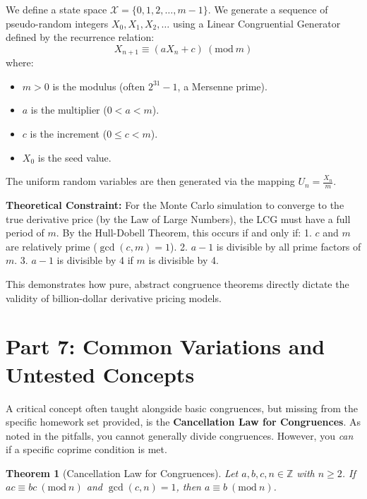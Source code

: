 \documentclass[11pt]{article}
\newtheorem{theorem}{Theorem}[section]
\newcommand{\Z}{\mathbb{Z}}
\newcommand{\modulo}[1]{\ (\mathrm{mod}\ #1)}
\begin{document}
We define a state space $\mathcal{X} = \{0, 1, 2, \dots, m-1\}$. We generate a sequence of pseudo-random integers $X_0, X_1, X_2, \dots$ using a Linear Congruential Generator defined by the recurrence relation:
\[ X_{n+1} \equiv (a X_n + c) \modulo{m} \]
where:
\begin{itemize}
    \item $m > 0$ is the modulus (often $2^{31}-1$, a Mersenne prime).
    \item $a$ is the multiplier ($0 < a < m$).
    \item $c$ is the increment ($0 \leq c < m$).
    \item $X_0$ is the seed value.
\end{itemize}
The uniform random variables are then generated via the mapping $U_n = \frac{X_n}{m}$. 

\textbf{Theoretical Constraint:} For the Monte Carlo simulation to converge to the true derivative price (by the Law of Large Numbers), the LCG must have a full period of $m$. By the Hull-Dobell Theorem, this occurs if and only if:
1. $c$ and $m$ are relatively prime ($\gcd(c,m)=1$).
2. $a - 1$ is divisible by all prime factors of $m$.
3. $a - 1$ is divisible by 4 if $m$ is divisible by 4.

This demonstrates how pure, abstract congruence theorems directly dictate the validity of billion-dollar derivative pricing models.

\newpage
\section{Part 7: Common Variations and Untested Concepts}

A critical concept often taught alongside basic congruences, but missing from the specific homework set provided, is the \textbf{Cancellation Law for Congruences}. As noted in the pitfalls, you cannot generally divide congruences. However, you \textit{can} if a specific coprime condition is met.

\begin{theorem}[Cancellation Law for Congruences]
Let $a, b, c, n \in \Z$ with $n \geq 2$. If $ac \equiv bc \modulo{n}$ and $\gcd(c, n) = 1$, then $a \equiv b \modulo{n}$.
\end{theorem}
\end{document}
